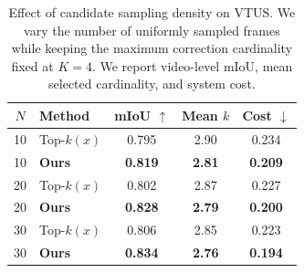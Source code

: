 \begin{table}[t]
\centering
\caption{Effect of candidate sampling density on VTUS.
We vary the number of uniformly sampled frames while
keeping the maximum correction cardinality fixed at $K=4$.
We report video-level mIoU, mean selected cardinality,
and system cost.}
\label{tab:vtus_candidate_sampling_density}
\small
\begin{tabular}{@{}clccc@{}}
\toprule
\textbf{$N$} & \textbf{Method} & \textbf{mIoU} $\uparrow$ & \textbf{Mean $k$} & \textbf{Cost} $\downarrow$ \\
\midrule
10 & Top-$k(x)$ & 0.795 & 2.90 & 0.234 \\
10 & \textbf{Ours} & \textbf{0.819} & \textbf{2.81} & \textbf{0.209} \\
\midrule
20 & Top-$k(x)$ & 0.802 & 2.87 & 0.227 \\
20 & \textbf{Ours} & \textbf{0.828} & \textbf{2.79} & \textbf{0.200} \\
\midrule
30 & Top-$k(x)$ & 0.806 & 2.85 & 0.223 \\
30 & \textbf{Ours} & \textbf{0.834} & \textbf{2.76} & \textbf{0.194} \\
\bottomrule
\end{tabular}
\end{table}
